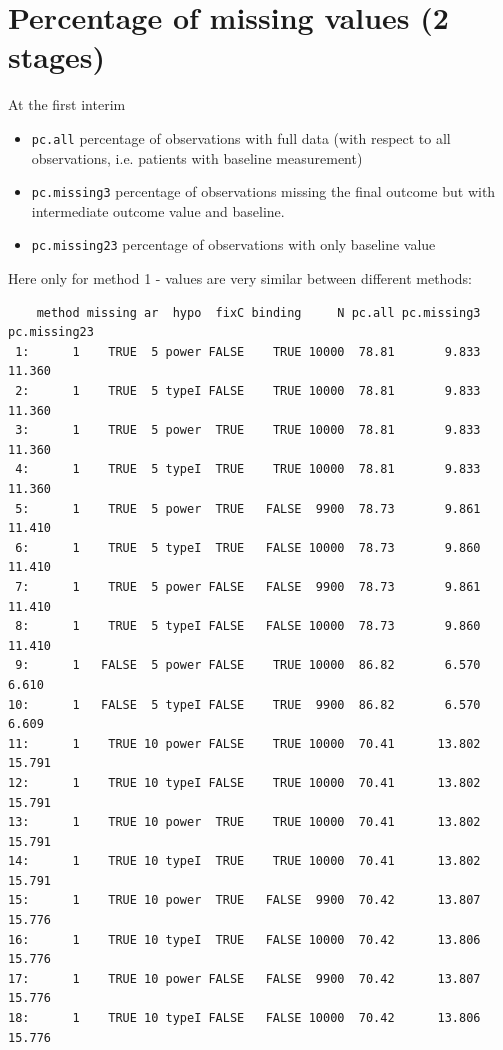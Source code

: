 \documentclass[12pt]{article}
\begin{document}
\clearpage

\section{Percentage of missing values (2 stages)}
\label{sec:org47c16d4}

At the first interim
\begin{itemize}
\item \texttt{pc.all} percentage of observations with full data (with respect to
all observations, i.e. patients with baseline measurement)
\item \texttt{pc.missing3} percentage of observations missing the final outcome
but with intermediate outcome value and baseline.
\item \texttt{pc.missing23} percentage of observations with only baseline value
\end{itemize}

Here only for method 1 - values are very similar between different
methods:
\begin{verbatim}
    method missing ar  hypo  fixC binding     N pc.all pc.missing3 pc.missing23
 1:      1    TRUE  5 power FALSE    TRUE 10000  78.81       9.833       11.360
 2:      1    TRUE  5 typeI FALSE    TRUE 10000  78.81       9.833       11.360
 3:      1    TRUE  5 power  TRUE    TRUE 10000  78.81       9.833       11.360
 4:      1    TRUE  5 typeI  TRUE    TRUE 10000  78.81       9.833       11.360
 5:      1    TRUE  5 power  TRUE   FALSE  9900  78.73       9.861       11.410
 6:      1    TRUE  5 typeI  TRUE   FALSE 10000  78.73       9.860       11.410
 7:      1    TRUE  5 power FALSE   FALSE  9900  78.73       9.861       11.410
 8:      1    TRUE  5 typeI FALSE   FALSE 10000  78.73       9.860       11.410
 9:      1   FALSE  5 power FALSE    TRUE 10000  86.82       6.570        6.610
10:      1   FALSE  5 typeI FALSE    TRUE  9900  86.82       6.570        6.609
11:      1    TRUE 10 power FALSE    TRUE 10000  70.41      13.802       15.791
12:      1    TRUE 10 typeI FALSE    TRUE 10000  70.41      13.802       15.791
13:      1    TRUE 10 power  TRUE    TRUE 10000  70.41      13.802       15.791
14:      1    TRUE 10 typeI  TRUE    TRUE 10000  70.41      13.802       15.791
15:      1    TRUE 10 power  TRUE   FALSE  9900  70.42      13.807       15.776
16:      1    TRUE 10 typeI  TRUE   FALSE 10000  70.42      13.806       15.776
17:      1    TRUE 10 power FALSE   FALSE  9900  70.42      13.807       15.776
18:      1    TRUE 10 typeI FALSE   FALSE 10000  70.42      13.806       15.776
\end{verbatim}
\end{document}
